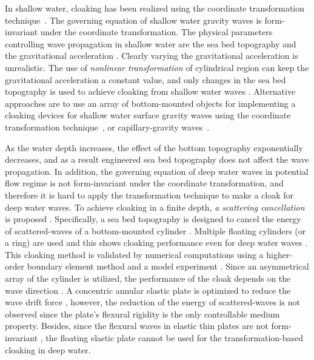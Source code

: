\documentclass{jfm}
\begin{document}
{In shallow water, cloaking has been realized using the coordinate transformation technique~\cite[][]{Berraquero2013,Zareei2015}.
The governing equation of shallow water gravity waves is form-invariant under the coordinate transformation.
The physical parameters controlling wave propagation in shallow water are the sea bed topography and the gravitational acceleration \cite[e.g.][]{Berraquero2013,Zareei2015}. Clearly varying the gravitational acceleration is unrealistic. 
The use of \textit{nonlinear transformation} of cylindrical region can keep the gravitational acceleration a constant value, and only changes in the sea bed topography is used to achieve cloaking from shallow water waves \cite[]{Zareei2015}.
Alternative approaches are to use an array of bottom-mounted objects for implementing a cloaking devices for shallow water surface gravity waves using the coordinate transformation technique~\cite[]{Dupont2016, Iida2018}, or capillary-gravity waves~\cite[]{Farhat2008}.}


{As the water depth increases, the effect of the bottom topography exponentially decreases, and as a result engineered sea bed topography does not affect the wave propagation. 
In addition, the governing equation of deep water waves in potential flow regime is not form-invariant under the coordinate transformation, and therefore it is hard to apply the transformation technique to make a cloak for deep water waves.
To achieve cloaking in a finite depth, \textit{a scattering cancellation} is proposed \cite[]{Porter2011, Porter2014}. 
Specifically, a sea bed topography is designed to cancel the energy of scattered-waves of a bottom-mounted cylinder \cite[]{Porter2014}.
Multiple floating cylinders (or a ring) are used and this shows cloaking performance even for deep water waves \cite[]{Newman2014}.
This cloaking method is validated by numerical computations using a higher-order boundary element method \cite[]{Iida2014} and a model experiment \cite[]{Iida2016}. 
Since an asymmetrical array of the cylinder is utilized, the performance of the cloak depends on the wave direction \cite[]{Zhang2019}.
A concentric annular elastic plate is optimized to reduce the wave drift force \cite[]{Loukogeorgaki2019}, however, the reduction of the energy of scattered-waves is not observed since the plate's flexural rigidity is the only controllable medium property. 
Besides, since the flexural waves in elastic thin plates are not form-invariant \cite[]{zareei2017broadband}, the floating elastic plate cannot be used for the transformation-based cloaking in deep water.
} 
\end{document}
